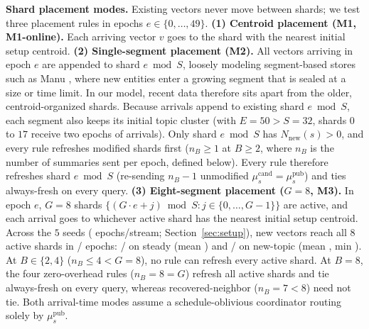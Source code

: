 \textbf{Shard placement modes.} Existing vectors never move between shards; we test three placement rules in epochs $e \in \{0, \dots, 49\}$. \textbf{(1) Centroid placement (M1, M1-online).} Each arriving vector $v$ goes to the shard with the nearest initial setup centroid. \textbf{(2) Single-segment placement (M2).} All vectors arriving in epoch $e$ are appended to shard $e \bmod S$, loosely modeling segment-based stores such as Manu \cite{guo2022manu}, where new entities enter a growing segment that is sealed at a size or time limit. In our model, recent data therefore sits apart from the older, centroid-organized shards. Because arrivals append to existing shard $e \bmod S$, each segment also keeps its initial topic cluster (with $E = 50 > S = 32$, shards $0$ to $17$ receive two epochs of arrivals). Only shard $e \bmod S$ has $N_{\text{new}}(s) > 0$, and every rule refreshes modified shards first ($n_B \ge 1$ at $B \ge 2$, where $n_B$ is the number of summaries sent per epoch, defined below). Every rule therefore refreshes shard $e \bmod S$ (re-sending $n_B - 1$ unmodified $\mu_s^{\text{cand}} = \mu_s^{\text{pub}}$) and ties always-fresh on every query. \textbf{(3) Eight-segment placement ($G = 8$, M3).} In epoch $e$, $G = 8$ shards $\{(G \cdot e + j) \bmod S : j \in \{0, \dots, G-1\}\}$ are active, and each arrival goes to whichever active shard has the nearest initial setup centroid. Across the $5$ seeds (\RNumMThreeActiveEpochsPerStream{} epochs/stream; Section~\ref{sec:setup}), new vectors reach all $8$ active shards in \RNumMThreeActiveTotalAllEight{}/\RNumMThreeActiveTotalEpochs{} epochs: \RNumMThreeActiveSteadyAllEight{}/\RNumMThreeActiveEpochsPerStream{} on steady (mean \RNumMThreeActiveSteadyMean{}) and \RNumMThreeActiveNewTopicAllEight{}/\RNumMThreeActiveEpochsPerStream{} on new-topic (mean \RNumMThreeActiveNewTopicMean{}, min \RNumMThreeActiveNewTopicMin{}). At $B \in \{2, 4\}$ ($n_B \le 4 < G = 8$), no rule can refresh every active shard. At $B = 8$, the four zero-overhead rules ($n_B = 8 = G$) refresh all active shards and tie always-fresh on every query, whereas recovered-neighbor ($n_B = 7 < 8$) need not tie. Both arrival-time modes assume a schedule-oblivious coordinator routing solely by $\mu_s^{\text{pub}}$.


